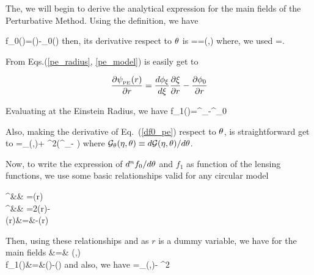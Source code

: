 The, we will begin to derive the analytical expression for the main fields of the Perturbative Method. Using the 
definition, we have

\beq
f_0(\te)=\phi(\xer)-\phi_0(\re)
\eeq
then, its derivative respect to $\theta$ is
\beq
{}==\dfrac{\phi^\prime_{\xer}}{\xer}\scriptg(\eta,\te)
\label{df0_pe}
\eeq
where, we used 
\beq
{}=\dfrac{\scriptg(\eta,\te)}{\xer}.                 
\label{dxer_pe}
\eeq

From Eqs.{(\ref{pe_radius}, \ref{pe_model})} is easily get to

\begin{equation*}
\dfrac{\partial \psi_{_{\mathrm{PE}}}(r) }{\partial r}=\dfrac{d\phi_\xi}{d\xi}\dfrac{\partial \xi}{\partial r}-\dfrac{\partial \phi_0}{\partial r}
\end{equation*}

Evaluating at the Einstein Radius, we have
\beq
f_1(\te)=\dfrac{\xer}{\re}\phi^\prime_{\xer}-\phi^\prime_0
\label{f1_pe}
\eeq

Also, making the derivative of Eq.~(\ref{df0_pe}) respect to $\theta$, is straightforward get to
\beq
{}=\scriptg_\te(\eta,\te)\dfrac{\phi^\prime_{\xer}}{\xer}+%
\left[ \dfrac{\scriptg(\eta,\te)}{\xer}\right]^2\left(\phi^{\prime\prime}_{\xer}-\dfrac{\phi^{\prime}_{\xer}}{\xer}  \right)
\label{ddf0_pe}
\eeq
where $\mathcal{G}_\theta(\eta,\theta)\equiv d\mathcal{G}(\eta,\theta)/d\theta$.

Now, to write the expression of $d^nf_0/d\theta$ and $f_1$ as function of the lensing functions, we use some basic relationships valid for
any circular model

\bea
\phi^\prime &\equiv& =\alpha(r) \label{dphi}\\
\phi^{\prime\prime}&\equiv& =2\kappa(r)-\label{ddphi}\\
\gamma(r)&=&-\kappa(r)
\eea

Then, using these relationships and as $r$ is a dummy variable, we have for the main fields
\bea
{}&=& \dfrac{\alpha(\xer)}{\xer}\scriptg(\eta,\te) \label{df0_pe2}\\
f_1(\te)&=&\dfrac{\xer}{\re}\alpha(\xer)-\alpha(\re) \label{f1_pe2}
\eea
and also, we have
\beq
\label{ddf0_pe2}
=\scriptg_\te(\eta,\te)\dfrac{\alpha(\xer)}{\xer}-%
\left[ \dfrac{\scriptg(\eta,\te)}{\xer}\right]^2 
\eeq

